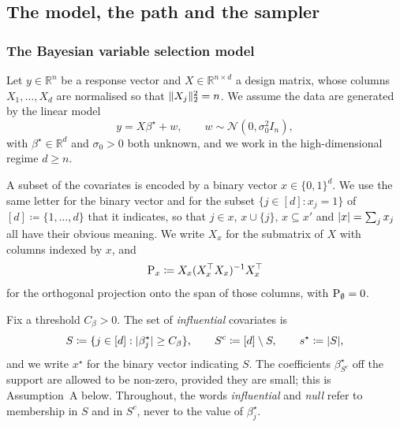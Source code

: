 \documentclass[aos]{imsart}%
\DeclarePairedDelimiter{\norm}{\lVert}{\rVert}
\DeclarePairedDelimiter{\abs}{\lvert}{\rvert}
\newcommand{\bbR}[0]{\mathbb{R}}
\newcommand{\calN}[0]{\mathcal{N}}
\theoremstyle{plain}
\theoremstyle{definition}
\begin{document}
    \subsection{The model, the path and the sampler}
    \label{sub:binary_setting}

    \subsubsection{The Bayesian variable selection model}
    \label{sub:binary_model}

    Let $y\in\bbR^{n}$ be a response vector and $X\in\bbR^{n\times d}$ a design
    matrix, whose columns $X_1,\dots,X_d$ are normalised so that
    $\norm{X_j}_2^{2}=n$. We assume the data are generated by the linear model
    \begin{equation}
        \label{eq:binary_linear}
        y=X\beta^{\star}+w,\qquad w\sim\calN(0,\sigma_0^{2}I_n),
    \end{equation}
    with $\beta^\star\in\bbR^{d}$ and $\sigma_0>0$ both unknown, and we work in
    the high-dimensional regime $d\geq n$.

    A subset of the covariates is encoded by a binary vector $x\in\{0,1\}^{d}$.
    We use the same letter for the binary vector and for the subset
    $\{j\in[d]:x_j=1\}$ of $[d]\coloneq\{1,\dots,d\}$ that it indicates, so that
    $j\in x$, $x\cup\{j\}$, $x\subseteq x'$ and $\abs{x}=\sum_{j}x_j$ all have
    their obvious meaning. We write $X_x$ for the submatrix of $X$ with columns
    indexed by $x$, and
    \begin{equation*}
        \mathrm{P}_x\coloneq X_x(X_x^{\top}X_x)^{-1}X_x^{\top}
    \end{equation*}
    for the orthogonal projection onto the span of those columns, with
    $\mathrm{P}_\emptyset=0$.

    Fix a threshold $C_\beta>0$. The set of \emph{influential} covariates is
    \begin{equation}
        \label{eq:binary_S}
        S\coloneq\{j\in[d]:\abs{\beta^\star_j}\geq C_\beta\},
        \qquad
        S^{c}\coloneq[d]\setminus S,
        \qquad
        s^{\star}\coloneq\abs{S},
    \end{equation}
    and we write $x^\star$ for the binary vector indicating $S$. The
    coefficients $\beta^\star_{S^{c}}$ off the support are allowed to be
    non-zero, provided they are small; this is Assumption~A below. Throughout,
    the words \emph{influential} and \emph{null} refer to membership in $S$ and
    in $S^{c}$, never to the value of $\beta^\star_j$.
\end{document}
